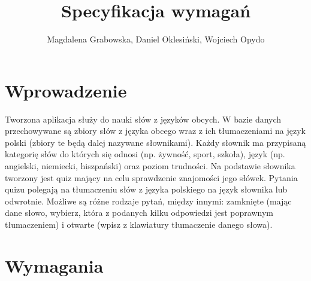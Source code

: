 \documentclass[a4paper,10pt]{article}
\title{Specyfikacja wymagań}
\author{Magdalena Grabowska, Daniel Oklesiński, Wojciech Opydo}
\begin{document}
\maketitle
\section{Wprowadzenie}
Tworzona aplikacja służy do nauki słów z języków obcych. W bazie danych przechowywane są zbiory słów z języka obcego wraz z ich tłumaczeniami na język polski (zbiory te będą dalej nazywane słownikami). Każdy słownik ma przypisaną kategorię słów do których się odnosi (np. żywność, sport, szkoła), język (np. angielski, niemiecki, hiszpański) oraz poziom trudności. Na podstawie słownika tworzony jest quiz mający na celu sprawdzenie znajomości jego słówek. Pytania quizu polegają na tłumaczeniu słów z języka polskiego na język słownika lub odwrotnie. Możliwe są różne rodzaje pytań, między innymi: zamknięte (mając dane słowo, wybierz, która z podanych kilku odpowiedzi jest poprawnym tłumaczeniem) i otwarte (wpisz z klawiatury tłumaczenie danego słowa).
\section{Wymagania}
\end{document}
